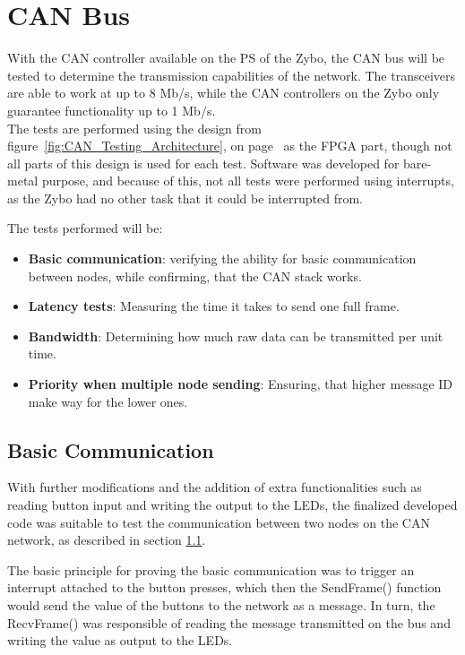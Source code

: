 
\section{CAN Bus}
\label{sub:CAN_Bus_Tests}
With the CAN controller available on the PS of the Zybo, the CAN bus will be tested to determine the transmission capabilities of the network.
The transceivers are able to work at up to 8 Mb/s, while the CAN controllers on the Zybo only guarantee functionality up to 1 Mb/s. \\

The tests are performed using the design from figure~\ref{fig:CAN_Testing_Architecture}, on page~\pageref{fig:CAN_Testing_Architecture} as the FPGA part, though not all parts of this design is used for each test.
Software was developed for bare-metal purpose, and because of this, not all tests were performed using interrupts, as the Zybo had no other task that it could be interrupted from.

The tests performed will be: 
\begin{itemize}
	\item \textbf{Basic communication}: verifying the ability for basic communication between nodes, while confirming, that the CAN stack works.
	\item \textbf{Latency tests}: Measuring the time it takes to send one full frame.
	\item \textbf{Bandwidth}: Determining how much raw data can be transmitted per unit time.
	\item \textbf{Priority when multiple node sending}: Ensuring, that higher message ID make way for the lower ones.
\end{itemize}

\subsection{Basic Communication}
\label{sub:TestingCANStack_BareMetal}


With further modifications and the addition of extra functionalities such as reading button input and writing the output to the LEDs, the finalized developed code was suitable to test the communication between two nodes on the CAN network, as described in section \ref{sub:TestingCANStack_BareMetal}.

The basic principle for proving the basic communication was to trigger an interrupt attached to the button presses, which then the SendFrame() function would send the value of the buttons to the network as a message.
In turn, the RecvFrame() was responsible of reading the message transmitted on the bus and writing the value as output to the LEDs.

